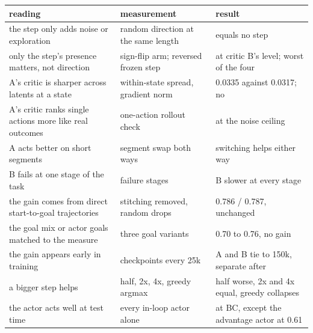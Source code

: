 \documentclass[11pt]{article}
\begin{document}
\begin{center}
\begin{tabular}{p{5.2cm} p{4.8cm} p{5cm}}
\hline
reading & measurement & result \\
\hline
the step only adds noise or exploration & random direction at the same length & equals no step \\
only the step's presence matters, not direction & sign-flip arm; reversed frozen step & at critic B's level; worst of the four \\
A's critic is sharper across latents at a state & within-state spread, gradient norm & 0.0335 against 0.0317; no \\
A's critic ranks single actions more like real outcomes & one-action rollout check & at the noise ceiling \\
A acts better on short segments & segment swap both ways & switching helps either way \\
B fails at one stage of the task & failure stages & B slower at every stage \\
the gain comes from direct start-to-goal trajectories & stitching removed, random drops & 0.786 / 0.787, unchanged \\
the goal mix or actor goals matched to the measure & three goal variants & 0.70 to 0.76, no gain \\
the gain appears early in training & checkpoints every 25k & A and B tie to 150k, separate after \\
a bigger step helps & half, 2x, 4x, greedy argmax & half worse, 2x and 4x equal, greedy collapses \\
the actor acts well at test time & every in-loop actor alone & at BC, except the advantage actor at 0.61 \\
\hline
\end{tabular}
\end{center}
\end{document}
